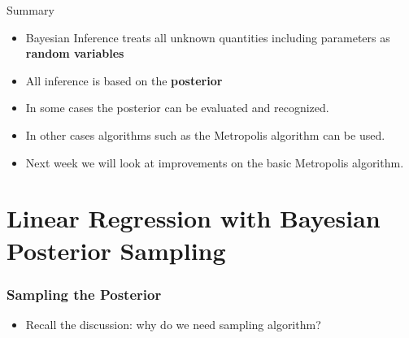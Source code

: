 \documentclass[10pt]{beamer}
\begin{document}
\begin{frame}{Summary}
  \begin{itemize}
  \item Bayesian Inference treats all unknown quantities including parameters as {\bf random variables}

  \item All inference is based on the {\bf posterior}

  \item In some cases the posterior can be evaluated and recognized.

  \item In other cases algorithms such as the Metropolis algorithm can be used.

  \item Next week we will look at improvements on the basic Metropolis algorithm.
  \end{itemize}
\end{frame}



\section{Linear Regression with Bayesian Posterior Sampling}

\begin{frame}
  \frametitle{Sampling the Posterior}

  \begin{itemize}
  \item Recall the discussion: why do we need sampling algorithm?
  \end{itemize}
\end{frame}
\end{document}
